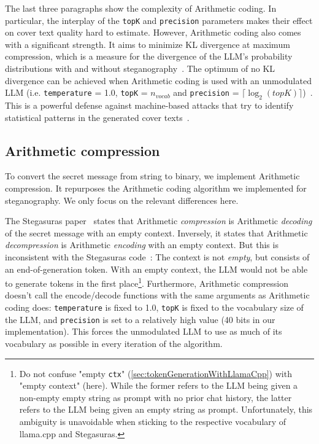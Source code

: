 The last three paragraphs show the complexity of Arithmetic coding. In particular, the interplay of the \lstinline|topK| and \lstinline|precision| parameters makes their effect on cover text quality hard to estimate. However, Arithmetic coding also comes with a significant strength. It aims to minimize \gls{KL} divergence at maximum compression, which is a measure for the divergence of the \gls{LLM}'s probability distributions with and without steganography~\cite{zieglerNeuralLinguisticSteganography2019}. The optimum of no \gls{KL} divergence can be achieved when Arithmetic coding is used with an unmodulated \gls{LLM} (i.e. \lstinline|temperature| = 1.0, \lstinline|topK| = $n_{vocab}$ and \lstinline|precision| = $ \lceil \log_2(topK) \rceil $)~\cite{zieglerNeuralLinguisticSteganography2019}. This is a powerful defense against machine-based attacks that try to identify statistical patterns in the generated cover texts~\cite{zieglerNeuralLinguisticSteganography2019}.

\subsection{Arithmetic compression}
\label{sec:arithmeticCompression}
To convert the secret message from string to binary, we implement Arithmetic compression. It repurposes the Arithmetic coding algorithm we implemented for steganography. We only focus on the relevant differences here.

The Stegasuras paper~\cite{zieglerNeuralLinguisticSteganography2019} states that Arithmetic \textit{compression} is Arithmetic \textit{decoding} of the secret message with an empty context. Inversely, it states that Arithmetic \textit{decompression} is Arithmetic \textit{encoding} with an empty context. But this is inconsistent with the Stegasuras code~\cite{zieglerHarvardnlpNeuralSteganography2025}: The context is not \textit{empty}, but consists of an end-of-generation token. With an empty context, the \gls{LLM} would not be able to generate tokens in the first place\footnote{Do not confuse "empty \lstinline|ctx|" (\cref{sec:tokenGenerationWithLlamaCpp}) with "empty context" (here). While the former refers to the \gls{LLM} being given a non-empty empty string as prompt with no prior chat history, the latter refers to the \gls{LLM} being given an empty string as prompt. Unfortunately, this ambiguity is unavoidable when sticking to the respective vocabulary of llama.cpp and Stegasuras.}. Furthermore, Arithmetic compression doesn't call the encode/decode functions with the same arguments as Arithmetic coding does: \lstinline|temperature| is fixed to 1.0, \lstinline|topK| is fixed to the vocabulary size of the \gls{LLM}, and \lstinline|precision| is set to a relatively high value (40 bits in our implementation). This forces the unmodulated \gls{LLM} to use as much of its vocabulary as possible in every iteration of the algorithm.

